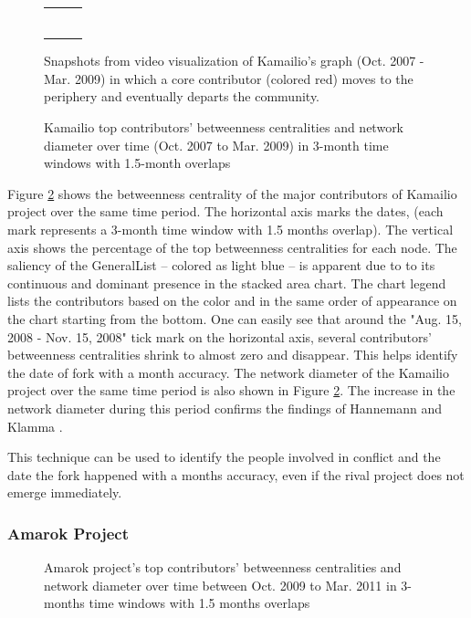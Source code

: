 \documentclass{acm_proc_article-sp}
\begin{document}
\begin{figure}[!ht]
\begin{tabularx}{\linewidth}{@{}cXX@{}}
\begin{tabular}{cccc}
\end{tabular} 
\end{tabularx} 
\caption{Snapshots from video visualization of Kamailio's graph (Oct. 2007 - Mar. 2009) in which a core contributor (colored red) moves to the periphery and eventually departs the community.} 
\label{figureKamailioGraph} 
\end{figure} 

\begin{figure}[!ht]
\centering
{}
\justifying
{}
\caption{Kamailio top contributors' betweenness centralities and network diameter over time (Oct. 2007 to Mar. 2009) in 3-month time windows with 1.5-month overlaps}
\label{figureKamailioStackedAreaChart}
\end{figure}

Figure \ref{figureKamailioStackedAreaChart} shows the betweenness centrality of the major contributors of Kamailio project over the same time period. The horizontal axis marks the dates, (each mark represents a 3-month time window with 1.5 months overlap). The vertical axis shows the percentage of the top betweenness centralities for each node. The saliency of the GeneralList -- colored as light blue -- is apparent due to to its continuous and dominant presence in the stacked area chart. The chart legend lists the contributors based on the color and in the same order of appearance on the chart starting from the bottom. One can easily see that around the "Aug. 15, 2008 - Nov. 15, 2008" tick mark on the horizontal axis, several contributors' betweenness centralities shrink to almost zero and disappear. This helps identify the date of fork with a month accuracy. The network diameter of the Kamailio project over the same time period is also shown in Figure \ref{figureKamailioStackedAreaChart}. The increase in the network diameter during this period confirms the findings of Hannemann and Klamma \cite{Hannemann}.

This technique can be used to identify the people involved in conflict and the date the fork happened with a months accuracy, even if the rival project does not emerge immediately.

\subsubsection{Amarok Project}
\begin{figure}[!Ht]
\centering
{}
\justifying
{}
\caption{Amarok project's top contributors' betweenness centralities and network diameter over time between Oct. 2009 to Mar. 2011 in 3-months time windows with 1.5 months overlaps}
\label{figureAmarokStachedAreaChart}
\end{figure}
\end{document}
